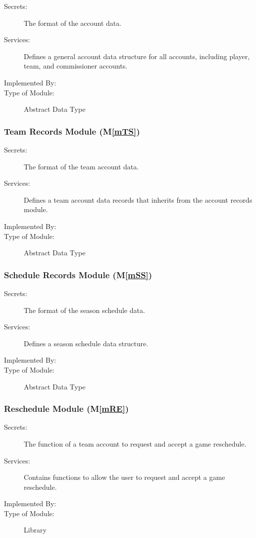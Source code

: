 \documentclass[12pt, titlepage]{article}
\newcommand{\mref}[1]{M\ref{#1}}
\begin{document}
\begin{description}
  \item[Secrets:]The format of the account data.
  \item[Services:]Defines a general account data structure for all accounts,
  including player, team, and commissioner accounts.
  \item[Implemented By:] \progname{}
  \item[Type of Module:] Abstract Data Type
\end{description}

\subsubsection{Team Records Module (\mref{mTS})}

\begin{description}
  \item[Secrets:]The format of the team account data.
  \item[Services:]Defines a team account data records that inherits from the
  account records module.
  \item[Implemented By:] \progname{}
  \item[Type of Module:] Abstract Data Type
\end{description}

\subsubsection{Schedule Records Module (\mref{mSS})}

\begin{description}
  \item[Secrets:]The format of the season schedule data.
  \item[Services:]Defines a season schedule data structure.
  \item[Implemented By:] \progname{}
  \item[Type of Module:] Abstract Data Type
\end{description}

\subsubsection{Reschedule Module (\mref{mRE})}

\begin{description}
  \item[Secrets:]The function of a team account to request and accept a game
  reschedule.
  \item[Services:]Contains functions to allow the user to request and accept a
  game reschedule.
  \item[Implemented By:] \progname{}
  \item[Type of Module:] Library
\end{description}
\end{document}
